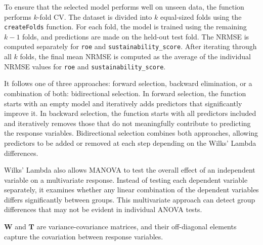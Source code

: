 \noindent To ensure that the selected model performs well on unseen data, the function performs $k$-fold CV. The dataset is divided into $k$ equal-sized folds using the \texttt{createFolds} function. For each fold, the model is trained using the remaining $k-1$ folds, and predictions are made on the held-out test fold. The NRMSE is computed separately for \texttt{roe} and \texttt{sustainability\_score}. After iterating through all $k$ folds, the final mean NRMSE is computed as the average of the individual NRMSE values for \texttt{roe} and \texttt{sustainability\_score}. 

It follows one of three approaches: forward selection, backward elimination, or a combination of both: bidirectional selection. In forward selection, the function starts with an empty model and iteratively adds predictors that significantly improve it. In backward selection, the function starts with all predictors included and iteratively removes those that do not meaningfully contribute to predicting the response variables. Bidirectional selection combines both approaches, allowing predictors to be added or removed at each step depending on the Wilks' Lambda differences.

Wilks' Lambda also allows MANOVA to test the overall effect of an independent variable on a multivariate response. Instead of testing each dependent variable separately, it examines whether any linear combination of the dependent variables differs significantly between groups. This multivariate approach can detect group differences that may not be evident in individual ANOVA tests.\cite{Newsom2024MANOVA}

$\mathbf{W}$ and $\mathbf{T}$ are variance-covariance matrices, and their off-diagonal elements capture the covariation between response variables.

